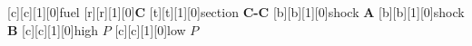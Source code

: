    [c][c][1][0]{fuel}
   [r][r][1][0]{\bf C}
   [t][t][1][0]{section {\bf C-C}}
   [b][b][1][0]{shock \bf A}
   [b][b][1][0]{shock \bf B}
   [c][c][1][0]{high $P$}
   [c][c][1][0]{low $P$}

